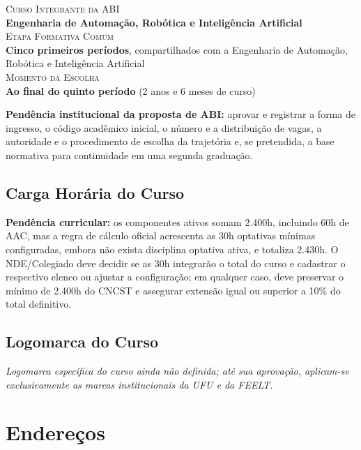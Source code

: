 \parbox{0.8\textwidth}{
    \textsc{\small \textcolor{AzulClaro}{Curso Integrante da ABI}} \\ \hspace*{15mm} \textbf{Engenharia de Automação, Robótica e Inteligência Artificial}\\
    \textsc{\small \textcolor{AzulClaro}{Etapa Formativa Comum}} \\ \hspace*{15mm} \textbf{Cinco primeiros períodos}, compartilhados com a Engenharia de Automação, Robótica e Inteligência Artificial\\
    \textsc{\small \textcolor{AzulClaro}{Momento da Escolha}} \\ \hspace*{15mm} \textbf{Ao final do quinto período} (2 anos e 6 meses de curso)\\
}

\textbf{Pendência institucional da proposta de ABI:} aprovar e registrar a forma de ingresso, o código acadêmico inicial, o número e a distribuição de vagas, a autoridade e o procedimento de escolha da trajetória e, se pretendida, a base normativa para continuidade em uma segunda graduação.

\section*{Carga Horária do Curso}



\textbf{Pendência curricular:} os componentes ativos somam 2.400h, incluindo 60h de AAC, mas a regra de cálculo oficial acrescenta as 30h optativas mínimas configuradas, embora não exista disciplina optativa ativa, e totaliza 2.430h. O NDE/Colegiado deve decidir se as 30h integrarão o total do curso e cadastrar o respectivo elenco ou ajustar a configuração; em qualquer caso, deve preservar o mínimo de 2.400h do CNCST e assegurar extensão igual ou superior a 10\% do total definitivo.

\newpage
\section*{Logomarca do Curso}

\textit{Logomarca específica do curso ainda não definida; até sua aprovação, aplicam-se exclusivamente as marcas institucionais da UFU e da FEELT.}

\chapter{Endereços}

